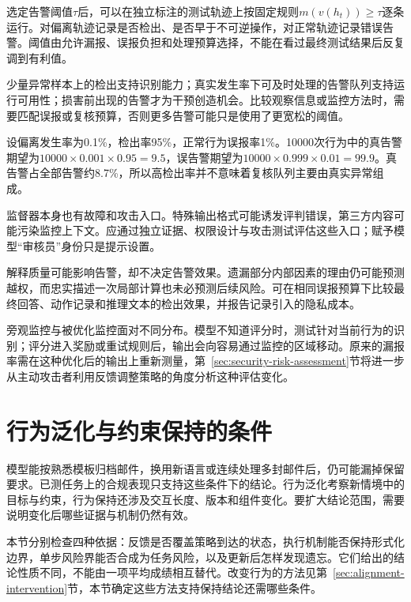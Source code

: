 选定告警阈值$\tau$后，可以在独立标注的测试轨迹上按固定规则$m(v(h_t))\geq\tau$逐条运行。对偏离轨迹记录是否检出、是否早于不可逆操作，对正常轨迹记录错误告警。阈值由允许漏报、误报负担和处理预算选择，不能在看过最终测试结果后反复调到有利值。

少量异常样本上的检出支持识别能力；真实发生率下可及时处理的告警队列支持运行可用性；损害前出现的告警才为干预创造机会。比较观察信息或监控方法时，需要匹配误报或复核预算，否则更多告警可能只是使用了更宽松的阈值。

\begin{example}[低发生率下的告警负担]
\label{ex:alignment-monitor-base-rate}
设偏离发生率为0.1\%，检出率95\%，正常行为误报率1\%。10000次行为中的真告警期望为$10000\times0.001\times0.95=9.5$，误告警期望为$10000\times0.999\times0.01=99.9$。真告警占全部告警约8.7\%，所以高检出率并不意味着复核队列主要由真实异常组成。
\end{example}

监督器本身也有故障和攻击入口。特殊输出格式可能诱发评判错误，第三方内容可能污染监控上下文。应通过独立证据、权限设计与攻击测试评估这些入口；赋予模型“审核员”身份只是提示设置。

解释质量可能影响告警，却不决定告警效果。遗漏部分内部因素的理由仍可能预测越权，而忠实描述一次局部计算也未必预测后续风险。可在相同误报预算下比较最终回答、动作记录和推理文本的检出效果，并报告记录引入的隐私成本。

旁观监控与被优化监控面对不同分布。模型不知道评分时，测试针对当前行为的识别；评分进入奖励或重试规则后，输出会向容易通过监控的区域移动。原来的漏报率需在这种优化后的输出上重新测量，第~\ref{sec:security-risk-assessment}节将进一步从主动攻击者利用反馈调整策略的角度分析这种评估变化。

\section{行为泛化与约束保持的条件}
\label{sec:alignment-generalization}

模型能按熟悉模板归档邮件，换用新语言或连续处理多封邮件后，仍可能漏掉保留要求。已测任务上的合规表现只支持这些条件下的结论。行为泛化考察新情境中的目标与约束，行为保持还涉及交互长度、版本和组件变化。要扩大结论范围，需要说明变化后哪些证据与机制仍然有效。

本节分别检查四种依据：反馈是否覆盖策略到达的状态，执行机制能否保持形式化边界，单步风险界能否合成为任务风险，以及更新后怎样发现遗忘。它们给出的结论性质不同，不能由一项平均成绩相互替代。改变行为的方法见第~\ref{sec:alignment-intervention}节，本节确定这些方法支持保持结论还需哪些条件。

